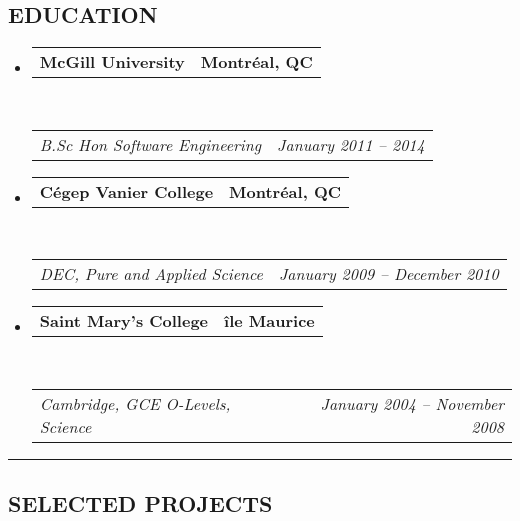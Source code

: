 \documentclass[10pt,letterpaper]{article}
\makeatletter
\newcommand{\headerrow}[2]
{\begin{tabular*}{\linewidth}{l@{\extracolsep{\fill}}r}
	#1 &
	#2 \\
\end{tabular*}}
\makeatother
\begin{document}
\subsection*{EDUCATION}

\begin{itemize}
	\parskip=0.1em

	\item
	\headerrow
		{\textbf{McGill University}}
		{\textbf{Montr\'{e}al, QC}}
	\\
	\headerrow
		{\emph{B.Sc Hon Software Engineering}}
		{\emph{January 2011 -- 2014}}

	\item
	\headerrow
		{\textbf{C\'{e}gep Vanier College}}
		{\textbf{Montr\'{e}al, QC}}
	\\
	\headerrow
		{\emph{DEC, Pure and Applied Science}}
		{\emph{January 2009 -- December 2010}}

	\item
	\headerrow
		{\textbf{Saint Mary's College}}
		{\textbf{\^{i}le Maurice}}
	\\
	\headerrow
		{\emph{Cambridge, GCE O-Levels, Science}}
		{\emph{January 2004 -- November 2008}}
\end{itemize}


\hrule
\vspace{-0.4em}
\subsection*{SELECTED PROJECTS}
\end{document}
